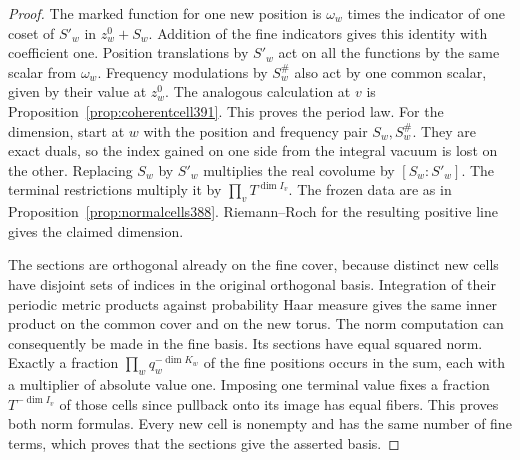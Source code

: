 \documentclass[a4paper,11pt]{article}
\theoremstyle{definition}
\theoremstyle{remark}
\numberwithin{equation}{section}
\begin{document}
\begin{proof}
The marked function for one new position is \(\omega_w\)
times the indicator of one coset of \(S'_w\) in \(z_w^0+S_w\).
Addition of the fine indicators gives this identity with
coefficient one. Position translations by \(S'_w\) act on
all the functions by the same scalar from \(\omega_w\).
Frequency modulations by \(S_w^\#\) also act by one common
scalar, given by their value at \(z_w^0\). The analogous
calculation at \(v\) is Proposition~\ref{prop:coherentcell391}.
This proves the period law. For the dimension, start at \(w\)
with the position and frequency pair \(S_w,S_w^\#\).
They are exact duals, so the index gained on one side from the
integral vacuum is lost on the other. Replacing \(S_w\) by
\(S'_w\) multiplies the real covolume by \([S_w:S'_w]\).
The terminal restrictions multiply it by \(\prod_vT^{\dim I_v}\).
The frozen data are as in Proposition~\ref{prop:normalcells388}.
Riemann--Roch for the resulting positive line gives the claimed
dimension.

The sections are orthogonal already on the fine cover, because
distinct new cells have disjoint sets of indices in the original
orthogonal basis. Integration of their periodic metric products
against probability Haar measure gives the same inner product
on the common cover and on the new torus. The norm computation
can consequently be made in the fine basis. Its sections have
equal squared norm. Exactly a fraction
\(\prod_w q_w^{-\dim K_w}\) of the fine positions occurs in the
sum, each with a multiplier of absolute value one. Imposing one
terminal value fixes a fraction \(T^{-\dim I_v}\) of those cells
since pullback onto its image has equal fibers. This proves both
norm formulas. Every new cell is nonempty and has the same number
of fine terms, which proves that the sections give the asserted
basis.
\end{proof}
\end{document}
